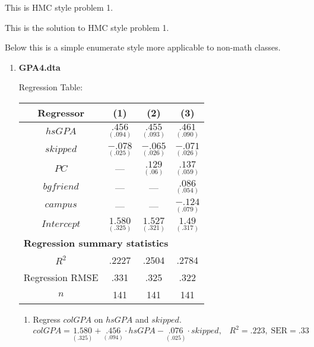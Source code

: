 \documentclass[12pt]{chmullighw}
\begin{document}

\begin{problem}[Q1]
	This is HMC style problem 1.
\end{problem}
\begin{solution}
	This is the solution to HMC style problem 1.
\end{solution}

Below this is a simple enumerate style more applicable to non-math classes.

\begin{enumerate}

\item \textbf{GPA4.dta}

	Regression Table: \\
	\begin{tabular}{|c|c|c|c|}
		\hline
		\textbf{Regressor} & \textbf{(1)} & \textbf{(2)} & \textbf{(3)}
		\\ \hline
		$hsGPA$ & $\underset{(.094)}{.456}$ & $\underset{(.093)}{.455}$ & $\underset{(.090)}{.461}$
		\\ \hline
		$skipped$ & $\underset{(.025)}{-.078}$ & $\underset{(.026)}{-.065}$ & $\underset{(.026)}{-.071}$
		\\ \hline
		$PC$ & --- & $\underset{(.06)}{.129}$ & $\underset{(.059)}{.137}$
		\\ \hline
		$bgfriend$ & --- & --- & $\underset{(.054)}{.086}$
		\\ \hline
		$campus$ & --- & --- & $\underset{(.079)}{-.124}$
		\\ \hline
		$Intercept$	& $\underset{(.325)}{1.580}$ & $\underset{(.321)}{1.527}$ & $\underset{(.317)}{1.49}$
		\\ \hline
		\multicolumn{4}{|l|}{\textbf{Regression summary statistics}} \\ \hline
		$R^2$ &	.2227 & .2504 & .2784 \\ \hline
		Regression RMSE & .331 & .325 & .322\\ \hline
		$n$ & 141 & 141 & 141 \\ \hline
		
	\end{tabular}
	
	\begin{enumerate}
		\item Regress $colGPA$ on $hsGPA$ and $skipped$.
		$$colGPA = \underset{(.325)}{1.580}
				 + \underset{(.094)}{.456}\cdot hsGPA
				 - \underset{(.025)}{.076}\cdot skipped,
				\;\;\; R^2 = .223, \; \text{SER} = .33 $$
				

\end{enumerate}
\end{enumerate}
\end{document}
